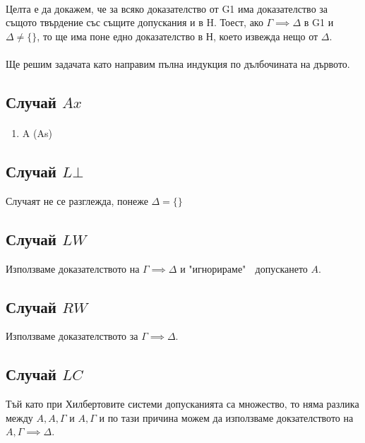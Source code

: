 \documentclass[12pt]{article}
\begin{document}
\newcommand\alphaeq{\mathrel{\stackrel{\makebox[0pt]{\mbox{\normalfont\tiny $\alpha$}}}{=}}}
\newcommand\betaeq{\mathrel{\stackrel{\makebox[0pt]{\mbox{\normalfont\tiny $\beta$}}}{=}}}
\newcommand\betaetaeq{\mathrel{\stackrel{\makebox[0pt]{\mbox{\normalfont\tiny $\beta\eta$}}}{=}}}

\paragraph*{}
Целта е да докажем, че за всяко доказателство от G1 има доказателство за същото твърдение със същите допускания и в H. Тоест, ако $\Gamma \implies \Delta$ в G1 и $\Delta \neq \{ \}$, то ще има поне едно доказателство в Н, което извежда нещо от $\Delta$.

\paragraph*{}
Ще решим задачата като направим пълна индукция по дълбочината на дървото. 

\subsection*{Случай $Ax$}
\paragraph*{}
\begin{enumerate}
    \item A (As)
\end{enumerate}

\subsection*{Случай $L \bot$}
Случаят не се разглежда, понеже $\Delta = \{\}$

\subsection*{Случай $LW$}
Използваме доказателството на $\Gamma \implies \Delta$ и "игнорираме" $\;$ допускането $A$. 

\subsection*{Случай $RW$}
Използваме доказателството за $\Gamma \implies \Delta$.

\subsection*{Случай $LC$}
Тъй като при Хилбертовите системи допусканията са множество, то няма разлика между $A, A, \Gamma$ и $A, \Gamma$ и по тази причина можем да използваме докзателството на $A, \Gamma \implies \Delta$.
\end{document}
